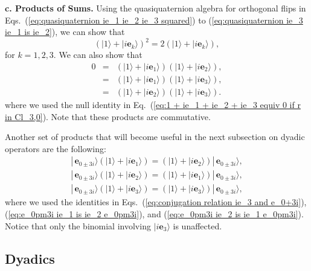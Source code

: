 \documentclass[11pt,twocolumn]{article}
\begin{document}
\textbf{c. Products of Sums.}  Using the quasiquaternion algebra for orthogonal flips in Eqs.~(\ref{eq:quasiquaternion ie_1 ie_2 ie_3 squared}) to (\ref{eq:quasiquaternion ie_3 ie_1 is ie_2}), we can show that
\begin{equation}
\label{eq:1 +ie_1 squared is 1 + ie_1}
(|1\rangle+|i\mathbf e_k\rangle)^2=2(|1\rangle+|i\mathbf e_k\rangle),
\end{equation}
for $k=1,2,3$.  We can also show that   
\begin{eqnarray}
\label{eq:1 + ie_1 times 1 + ie_2 is 0}
0&=&(|1\rangle+|i\mathbf e_1\rangle)(|1\rangle+|i\mathbf e_2\rangle),\\
\label{eq:1 + ie_1 times 1 + ie_3 is 0}
&=&(|1\rangle+|i\mathbf e_1\rangle)(|1\rangle+|i\mathbf e_3\rangle),\\
\label{eq:1 + ie_2 times 1 + ie_3 is 0}
&=&(|1\rangle+|i\mathbf e_2\rangle)(|1\rangle+|i\mathbf e_3\rangle).
\end{eqnarray}
where we used the null identity in Eq.~(\ref{eq:1 + ie_1 + ie_2 + ie_3 equiv 0 if r in Cl_3,0}).  Note that these products are commutative. 

Another set of products that will become useful in the next subsection on dyadic operators are the following:
\begin{eqnarray}
\label{eq:e_0pm3i times 1 + ie_1 is 1 + ie_2 e_0pm3i}
|\,\mathbf e_{0\pm 3i}\rangle(|1\rangle+|i\mathbf e_1\rangle)=(|1\rangle+|i\mathbf e_2\rangle)|\,\mathbf e_{0\pm 3i}\rangle,\\
\label{eq:e_0pm3i times 1 + ie_2 is 1 + ie_1 e_0pm3i}
|\,\mathbf e_{0\pm 3i}\rangle(|1\rangle+|i\mathbf e_2\rangle)=(|1\rangle+|i\mathbf e_1\rangle)|\,\mathbf e_{0\pm 3i}\rangle,\\
\label{eq:e_0pm3i times 1 + ie_3 is 1 + ie_3 e_0pm3i}
|\,\mathbf e_{0\pm 3i}\rangle(|1\rangle+|i\mathbf e_3\rangle)=(|1\rangle+|i\mathbf e_3\rangle)|\,\mathbf e_{0\pm 3i}\rangle,
\end{eqnarray}
where we used the identities in Eqs.~(\ref{eq:conjugation relation ie_3 and e_0+3i}), (\ref{eq:e_0pm3i ie_1 is ie_2 e_0pm3i}), and (\ref{eq:e_0pm3i ie_2 is ie_1 e_0pm3i}).  Notice that only the binomial involving $|i\mathbf e_3\rangle$ is unaffected.

\subsection{Dyadics}
\end{document}
